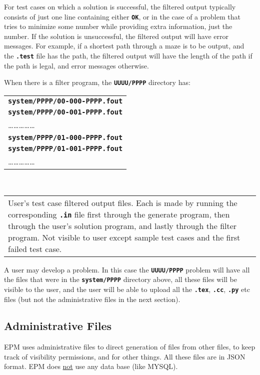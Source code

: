 \documentclass[12pt]{article}
\newcommand{\TT}[1]{{\tt \bfseries #1}}
\newenvironment{indpar}[1][0.4in]%
	{\begin{list}{}%
		     {\setlength{\itemsep}{0in}%
		      \setlength{\topsep}{0in}%
		      \setlength{\parsep}{1ex}%
		      \setlength{\labelwidth}{#1}%
		      \setlength{\leftmargin}{#1}%
		      \addtolength{\leftmargin}{\labelsep}}%
	 \item}%
	{\end{list}}
\newcommand{\ITEM}{\hspace*{-0.2in}}
\begin{document}
For test cases on which a solution is successful, the filtered output
typically consists of just one line containing either \TT{OK}, or in
the case of a problem that tries to minimize some number while providing
extra information, just the number.  If the solution is unsuccessful,
the filtered output will have error messages.  For example, if a shortest path
through a maze is to be output, and the \TT{.test} file has the path,
the filtered output will have the length of the path if the path is
legal, and error messages otherwise.

When there is a filter program, the \TT{UUUU/PPPP} directory has:

\begin{indpar}
\ITEM\begin{tabular}[t]{@{}l}
     \TT{system/PPPP/00-000-PPPP.fout} \\
     \TT{system/PPPP/00-001-PPPP.fout} \\
     \ldots\ldots\ldots\ldots\ldots \\
     \TT{system/PPPP/01-000-PPPP.fout} \\
     \TT{system/PPPP/01-001-PPPP.fout} \\
     \ldots\ldots\ldots\ldots\ldots \\
     \end{tabular}
     ~~~~
     \begin{tabular}[t]{p{3in}}
     User's test case filtered output files.  Each is made by running
     the corresponding \TT{.in} file first through the generate
     program, then through the user's solution program, and lastly
     through the filter program.
     Not visible to user except sample test cases and the first failed
     test case.
     \end{tabular}
\end{indpar}

A user may develop a problem.  In this case the \TT{UUUU/PPPP} problem
will have all the files that were in the \TT{system/PPPP} directory
above, all these files will be visible to the user, and the user
will be able to upload all the \TT{.tex}, \TT{.cc}, \TT{.py} etc
files (but not the administrative files in the next section).

\subsection{Administrative Files}

EPM uses administrative files to direct generation of files from
other files, to keep track of visibility
permissions, and for other things.  All these files are in JSON
format.  EPM does \underline{not} use any data base (like MYSQL).
\end{document}
